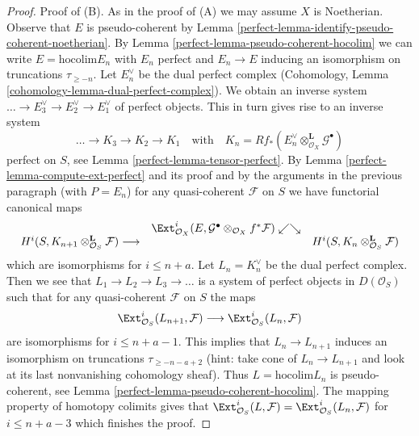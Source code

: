 \begin{proof}
\medskip\noindent
Proof of (B). As in the proof of (A) we may assume $X$ is Noetherian.
Observe that $E$ is pseudo-coherent by
Lemma \ref{perfect-lemma-identify-pseudo-coherent-noetherian}.
By Lemma \ref{perfect-lemma-pseudo-coherent-hocolim} we can write
$E = \text{hocolim} E_n$ with $E_n$ perfect and $E_n \to E$ inducing
an isomorphism on truncations $\tau_{\geq -n}$. Let $E_n^\vee$
be the dual perfect complex
(Cohomology, Lemma \ref{cohomology-lemma-dual-perfect-complex}).
We obtain an inverse system $\ldots \to E_3^\vee \to E_2^\vee \to E_1^\vee$
of perfect objects. This in turn gives rise to an inverse system
$$
\ldots \to K_3 \to K_2 \to K_1\quad\text{with}\quad
K_n = Rf_*(E_n^\vee \otimes_{\mathcal{O}_X}^\mathbf{L} \mathcal{G}^\bullet)
$$
perfect on $S$, see Lemma \ref{perfect-lemma-tensor-perfect}.
By Lemma \ref{perfect-lemma-compute-ext-perfect} and its proof and
by the arguments in the previous paragraph (with $P = E_n$)
for any quasi-coherent $\mathcal{F}$ on $S$ we have
functorial canonical maps
$$
\begin{array}{ccc} & \Ext^i_{\mathcal{O}_X}(E,
\mathcal{G}^\bullet \otimes_{\mathcal{O}_X} f^*\mathcal{F})
\swarrow\searrow &  \\ H^i(S, K_{n + 1} \otimes_{\mathcal{O}_S}^\mathbf{L} \mathcal{F})
\longrightarrow &  & H^i(S, K_n \otimes_{\mathcal{O}_S}^\mathbf{L} \mathcal{F})\end{array}
$$
which are isomorphisms for $i \leq n + a$.
Let $L_n = K_n^\vee$ be the dual perfect complex.
Then we see that $L_1 \to L_2 \to L_3 \to \ldots$
is a system of perfect objects in $D(\mathcal{O}_S)$
such that for any quasi-coherent $\mathcal{F}$ on $S$
the maps
$$
\Ext^i_{\mathcal{O}_S}(L_{n + 1}, \mathcal{F})
\longrightarrow
\Ext^i_{\mathcal{O}_S}(L_n, \mathcal{F})
$$
are isomorphisms for $i \leq n + a - 1$. This implies that
$L_n \to L_{n + 1}$ induces an isomorphism on truncations
$\tau_{\geq -n - a + 2}$ (hint: take cone of $L_n \to L_{n + 1}$
and look at its last nonvanishing cohomology sheaf).
Thus $L = \text{hocolim} L_n$ is pseudo-coherent, see
Lemma \ref{perfect-lemma-pseudo-coherent-hocolim}. The mapping property
of homotopy colimits gives that
$\Ext^i_{\mathcal{O}_S}(L, \mathcal{F}) =
\Ext^i_{\mathcal{O}_S}(L_n, \mathcal{F})$
for $i \leq n + a - 3$ which finishes the proof.
\end{proof}

